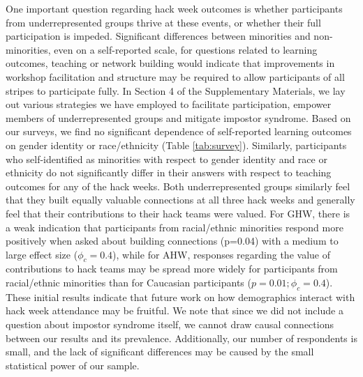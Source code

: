 One important question regarding hack week outcomes is whether participants from underrepresented groups thrive at these events, or whether their full participation is impeded. Significant differences between minorities and non-minorities, even on a self-reported scale, for questions related to learning outcomes, teaching or network building would indicate that improvements in workshop facilitation and structure may be required to allow participants of all stripes to participate fully.
In Section 4 of the Supplementary Materials, we lay out various strategies we have employed to facilitate participation, empower members of underrepresented groups and mitigate impostor syndrome. Based on our surveys, we find no significant dependence of self-reported learning outcomes on gender identity or race/ethnicity (Table \ref{tab:survey}). Similarly, participants who self-identified as minorities with respect to gender identity and race or ethnicity do not significantly differ in their answers with respect to teaching outcomes for any of the hack weeks. Both underrepresented groups similarly feel that they built equally valuable connections at all three hack weeks and generally feel that their contributions to their hack teams were valued. For GHW, there is a weak indication that participants from racial/ethnic minorities respond more positively when asked about building connections (p=0.04) with a medium to large effect size ($\phi_c = 0.4$), while for AHW, responses regarding the value of contributions to hack teams may be spread more widely for participants from racial/ethnic minorities than for Caucasian participants ($p = 0.01; \phi_c = 0.4$). These initial results indicate that future work on how demographics interact with hack week attendance may be fruitful. We note that since we did not include a question about impostor syndrome itself, we cannot draw causal connections between our results and its prevalence. Additionally, our number of respondents is small, and the lack of significant differences may be caused by the small statistical power of our sample.

